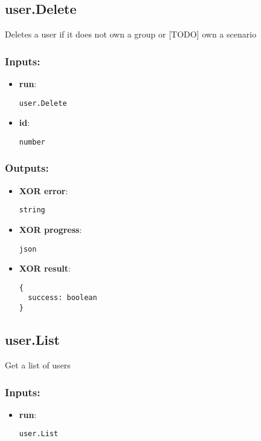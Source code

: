 \subsection{user.Delete}
\label{ch:builtinservices:user.Delete}
Deletes a user if it does not own a group or [TODO] own a scenario
\subsubsection*{Inputs:}
\begin{itemize}
    \item \textbf{run}: 
\begin{lstlisting}
user.Delete
\end{lstlisting}
    \item \textbf{id}: 
\begin{lstlisting}
number
\end{lstlisting}
  \end{itemize}

\subsubsection*{Outputs:}
\begin{itemize}
    \item \textbf{XOR error}: 
\begin{lstlisting}
string
\end{lstlisting}
    \item \textbf{XOR progress}: 
\begin{lstlisting}
json
\end{lstlisting}
    \item \textbf{XOR result}: 
\begin{lstlisting}
{
  success: boolean
}
\end{lstlisting}
  \end{itemize}

\subsection{user.List}
\label{ch:builtinservices:user.List}
Get a list of users
\subsubsection*{Inputs:}
\begin{itemize}
    \item \textbf{run}: 
\begin{lstlisting}
user.List
\end{lstlisting}
  \end{itemize}

